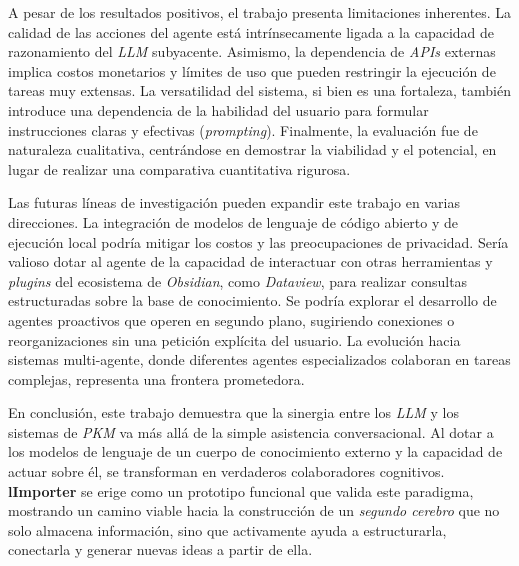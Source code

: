 \newpage

A pesar de los resultados positivos, el trabajo presenta limitaciones inherentes. La calidad de las acciones del agente está intrínsecamente ligada a la capacidad de razonamiento del \textit{LLM} subyacente. Asimismo, la dependencia de \textit{APIs} externas implica costos monetarios y límites de uso que pueden restringir la ejecución de tareas muy extensas. La versatilidad del sistema, si bien es una fortaleza, también introduce una dependencia de la habilidad del usuario para formular instrucciones claras y efectivas (\textit{prompting}). Finalmente, la evaluación fue de naturaleza cualitativa, centrándose en demostrar la viabilidad y el potencial, en lugar de realizar una comparativa cuantitativa rigurosa.

Las futuras líneas de investigación pueden expandir este trabajo en varias direcciones. La integración de modelos de lenguaje de código abierto y de ejecución local podría mitigar los costos y las preocupaciones de privacidad. Sería valioso dotar al agente de la capacidad de interactuar con otras herramientas y \textit{plugins} del ecosistema de \textit{Obsidian}, como \textit{Dataview}, para realizar consultas estructuradas sobre la base de conocimiento. Se podría explorar el desarrollo de agentes proactivos que operen en segundo plano, sugiriendo conexiones o reorganizaciones sin una petición explícita del usuario. La evolución hacia sistemas multi-agente, donde diferentes agentes especializados colaboran en tareas complejas, representa una frontera prometedora.

En conclusión, este trabajo demuestra que la sinergia entre los \textit{LLM} y los sistemas de \textit{PKM} va más allá de la simple asistencia conversacional. Al dotar a los modelos de lenguaje de un cuerpo de conocimiento externo y la capacidad de actuar sobre él, se transforman en verdaderos colaboradores cognitivos. \textbf{lImporter} se erige como un prototipo funcional que valida este paradigma, mostrando un camino viable hacia la construcción de un \textit{segundo cerebro} que no solo almacena información, sino que activamente ayuda a estructurarla, conectarla y generar nuevas ideas a partir de ella.